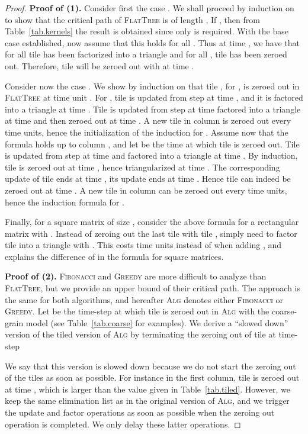 \documentclass[a4paper,twopages]{article}
\newcommand{\MC}{\textsc{Fibonacci}\xspace}
\newcommand{\Greedy}{\textsc{Greedy}\xspace}
\newcommand{\FT}{\textsc{FlatTree}\xspace}
\newcommand{\Alg}{\textsc{Alg}\xspace}
\begin{document}
\begin{proof}
\textbf{Proof of (1).}
    Consider first the case . We shall proceed by
    induction on  to show that the critical path of \FT is of length ,
    If , then from Table~\ref{tab.kernels} the result
    is obtained since only  is required.  With the base case
    established, now assume that this holds for all .  Thus at
    time , we have that for all  tile
     has been factorized into a triangle and for all ,
    tile  has been zeroed out.  Therefore, tile  will be zeroed
    out with  at time .

    Consider now the case . We show by induction on  that tile , for , is zeroed
    out in \FT at time unit .  For , tile  is updated from step 
    at time , and it is factored into a triangle at time . Tile
     is updated from step  at time  factored into a triangle at
    time  and then zeroed out at time . A new tile in column  is zeroed out every  time units, hence the
    initialization of the induction for .
    Assume now that the formula holds up to column , and let  be the time at which tile  is zeroed out.  Tile 
    is updated from step  at time  and factored into a
    triangle at time . By induction, tile  is zeroed out at time
    , hence triangularized at time . The corresponding 
    update of tile  ends at time , its  update ends at
    time .  Hence tile  can indeed be zeroed
    out at time . A new tile in column  can be
    zeroed out every  time units, hence the induction formula for .

    Finally, for a square matrix of size , consider the above formula for a
    rectangular matrix with . Instead of zeroing out the last tile
     with tile ,
    simply need to factor tile  into a triangle with . This
    costs  time units instead of  when adding , and explains the difference of  in
    the formula for square matrices.

\textbf{Proof of (2).}
    \MC and \Greedy are more difficult to analyze than \FT, but we provide an
    upper bound of their critical path. The approach is the same for both
    algorithms, and hereafter \Alg denotes either \MC or \Greedy.  Let
     be the time-step at which tile  is zeroed out in \Alg
    with the coarse-grain model (see Table~\ref{tab.coarse} for examples).  We
    derive a ``slowed down'' version of the tiled version of \Alg by
    terminating the zeroing out of tile  at time-step
    
    We say that this version is
    slowed down because we do not start the zeroing out of the tiles as soon as
    possible. For instance in the first column, tile  is zeroed out at
    time , which is larger than the value given in
    Table~\ref{tab.tiled}.  However, we keep the same elimination list as in
    the original version of \Alg, and we trigger the update and factor
    operations as soon as possible when the zeroing out operation is completed.
    We only delay these latter operations.


\end{proof}
\end{document}
